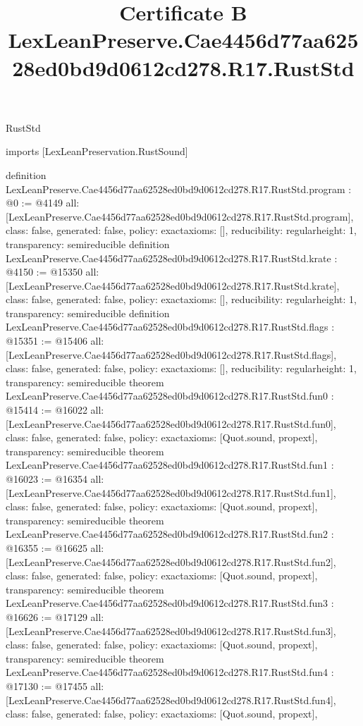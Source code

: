 \begin{lexlean}{RustStd}
\title{Certificate B LexLeanPreserve.Cae4456d77aa62528ed0bd9d0612cd278.R17.RustStd}
\begin{coremodule}
imports [LexLeanPreservation.RustSound]

definition LexLeanPreserve.Cae4456d77aa62528ed0bd9d0612cd278.R17.RustStd.program : @0 := @4149 {
  all: [LexLeanPreserve.Cae4456d77aa62528ed0bd9d0612cd278.R17.RustStd.program],
  class: false,
  generated: false,
  policy: exact{axioms: []},
  reducibility: regular{height: 1},
  transparency: semireducible
}
definition LexLeanPreserve.Cae4456d77aa62528ed0bd9d0612cd278.R17.RustStd.krate : @4150 := @15350 {
  all: [LexLeanPreserve.Cae4456d77aa62528ed0bd9d0612cd278.R17.RustStd.krate],
  class: false,
  generated: false,
  policy: exact{axioms: []},
  reducibility: regular{height: 1},
  transparency: semireducible
}
definition LexLeanPreserve.Cae4456d77aa62528ed0bd9d0612cd278.R17.RustStd.flags : @15351 := @15406 {
  all: [LexLeanPreserve.Cae4456d77aa62528ed0bd9d0612cd278.R17.RustStd.flags],
  class: false,
  generated: false,
  policy: exact{axioms: []},
  reducibility: regular{height: 1},
  transparency: semireducible
}
theorem LexLeanPreserve.Cae4456d77aa62528ed0bd9d0612cd278.R17.RustStd.fun0 : @15414 := @16022 {
  all: [LexLeanPreserve.Cae4456d77aa62528ed0bd9d0612cd278.R17.RustStd.fun0],
  class: false,
  generated: false,
  policy: exact{axioms: [Quot.sound, propext]},
  transparency: semireducible
}
theorem LexLeanPreserve.Cae4456d77aa62528ed0bd9d0612cd278.R17.RustStd.fun1 : @16023 := @16354 {
  all: [LexLeanPreserve.Cae4456d77aa62528ed0bd9d0612cd278.R17.RustStd.fun1],
  class: false,
  generated: false,
  policy: exact{axioms: [Quot.sound, propext]},
  transparency: semireducible
}
theorem LexLeanPreserve.Cae4456d77aa62528ed0bd9d0612cd278.R17.RustStd.fun2 : @16355 := @16625 {
  all: [LexLeanPreserve.Cae4456d77aa62528ed0bd9d0612cd278.R17.RustStd.fun2],
  class: false,
  generated: false,
  policy: exact{axioms: [Quot.sound, propext]},
  transparency: semireducible
}
theorem LexLeanPreserve.Cae4456d77aa62528ed0bd9d0612cd278.R17.RustStd.fun3 : @16626 := @17129 {
  all: [LexLeanPreserve.Cae4456d77aa62528ed0bd9d0612cd278.R17.RustStd.fun3],
  class: false,
  generated: false,
  policy: exact{axioms: [Quot.sound, propext]},
  transparency: semireducible
}
theorem LexLeanPreserve.Cae4456d77aa62528ed0bd9d0612cd278.R17.RustStd.fun4 : @17130 := @17455 {
  all: [LexLeanPreserve.Cae4456d77aa62528ed0bd9d0612cd278.R17.RustStd.fun4],
  class: false,
  generated: false,
  policy: exact{axioms: [Quot.sound, propext]},
}
\end{coremodule}
\end{lexlean}
